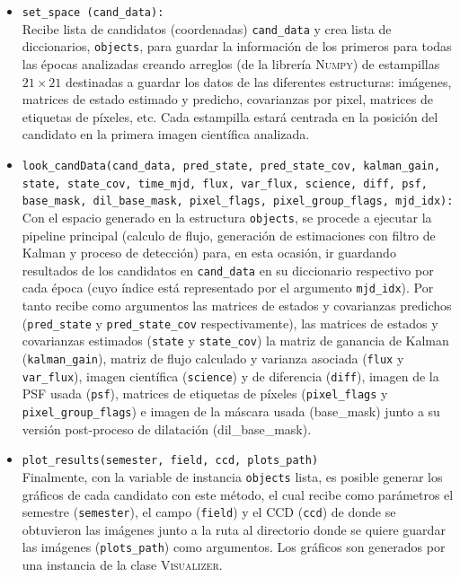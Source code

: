 \begin{itemize}
\item \texttt{set\_space (cand\_data):}\\
Recibe lista de candidatos (coordenadas) \texttt{cand\_data} y crea lista de diccionarios, \texttt{objects}, para guardar la informaci\'on de los primeros para todas las \'epocas analizadas creando arreglos (de la librer\'ia \textsc{Numpy}) de estampillas $21 \times 21$ destinadas a guardar los datos de las diferentes estructuras: im\'agenes, matrices de estado estimado y predicho, covarianzas por pixel, matrices de etiquetas de p\'ixeles, etc. Cada estampilla estar\'a centrada en la posici\'on del candidato en la primera imagen cient\'ifica analizada. 
\bigskip

\item \texttt{look\_candData(cand\_data, pred\_state, pred\_state\_cov, kalman\_gain, state, state\_cov, time\_mjd, flux, var\_flux, science, diff, psf, base\_mask, dil\_base\_mask, pixel\_flags, pixel\_group\_flags, mjd\_idx):}\\

Con el espacio generado en la estructura \texttt{objects}, se procede a ejecutar la pipeline principal (calculo de flujo, generaci\'on de estimaciones con filtro de Kalman y proceso de detecci\'on) para, en esta ocasi\'on, ir guardando resultados de los candidatos en \texttt{cand\_data} en su diccionario respectivo por cada \'epoca (cuyo \'indice est\'a representado por el argumento \texttt{mjd\_idx}). Por tanto recibe como argumentos las matrices de estados y covarianzas predichos (\texttt{pred\_state} y \texttt{pred\_state\_cov} respectivamente), las matrices de estados y covarianzas estimados (\texttt{state} y \texttt{state\_cov}) la matriz de ganancia de Kalman (\texttt{kalman\_gain}), matriz de flujo calculado y varianza asociada (\texttt{flux} y \texttt{var\_flux}), imagen cient\'ifica (\texttt{science}) y de diferencia (\texttt{diff}), imagen de la PSF usada (\texttt{psf}), matrices de etiquetas de p\'ixeles (\texttt{pixel\_flags} y \texttt{pixel\_group\_flags}) e imagen de la m\'ascara usada (base\_mask) junto a su versi\'on post-proceso de dilataci\'on (dil\_base\_mask).


\item \texttt{plot\_results(semester, field, ccd, plots\_path)}\\
Finalmente, con la variable de instancia \texttt{objects} lista, es posible generar los gr\'aficos de cada candidato con este m\'etodo, el cual recibe como par\'ametros el semestre (\texttt{semester}), el campo (\texttt{field}) y el CCD (\texttt{ccd}) de donde se obtuvieron las im\'agenes junto a la ruta al directorio donde se quiere guardar las im\'agenes (\texttt{plots\_path}) como argumentos. Los gr\'aficos son generados por una instancia de la clase \textsc{Visualizer}.
\end{itemize}

